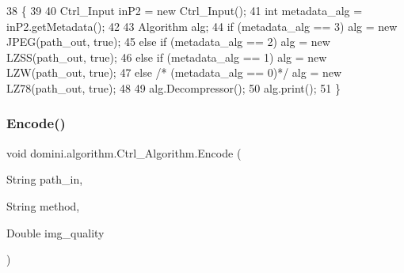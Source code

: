 \begin{DoxyCode}
38                                         \{
39 
40         Ctrl\_Input inP2 = \textcolor{keyword}{new} Ctrl\_Input();
41         \textcolor{keywordtype}{int} metadata\_alg = inP2.getMetadata();
42 
43         Algorithm alg;
44         \textcolor{keywordflow}{if}      (metadata\_alg == 3)   alg = \textcolor{keyword}{new} JPEG(path\_out, \textcolor{keyword}{true});
45         \textcolor{keywordflow}{else} \textcolor{keywordflow}{if} (metadata\_alg == 2)   alg = \textcolor{keyword}{new} LZSS(path\_out, \textcolor{keyword}{true});
46         \textcolor{keywordflow}{else} \textcolor{keywordflow}{if} (metadata\_alg == 1)   alg = \textcolor{keyword}{new} LZW(path\_out, \textcolor{keyword}{true});
47         \textcolor{keywordflow}{else} \textcolor{comment}{/* (metadata\_alg == 0)*/} alg = \textcolor{keyword}{new} LZ78(path\_out, \textcolor{keyword}{true});
48         
49         alg.Decompressor();      
50         alg.print();
51     \}
\end{DoxyCode}
\mbox{\label{classdomini_1_1algorithm_1_1Ctrl__Algorithm_ac03e09b1fd22f0857bf766fc692efc33}} 
\subsubsection{\texorpdfstring{Encode()}{Encode()}}
{\footnotesize\ttfamily void domini.\+algorithm.\+Ctrl\+\_\+\+Algorithm.\+Encode (\begin{DoxyParamCaption}\item[{String}]{path\+\_\+in,  }\item[{String}]{method,  }\item[{Double}]{img\+\_\+quality }\end{DoxyParamCaption})\hspace{0.3cm}{\ttfamily [inline]}}


